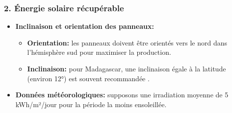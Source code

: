 \subsubsection*{2. Énergie solaire récupérable}
\begin{itemize}
	\item \textbf{Inclinaison et orientation des panneaux:}
	\begin{itemize}
		\item \textbf{Orientation:} les panneaux doivent être orientés vers le nord dans l'hémisphère sud pour maximiser la production.
		\item \textbf{Inclinaison:} pour Madagascar, une inclinaison égale à la latitude (environ 12°) est souvent recommandée \cite{pdf1}.
	\end{itemize}
	\item \textbf{Données météorologiques:} 
	supposons une irradiation moyenne de 5 kWh/m²/jour pour la période la moins ensoleillée.
\end{itemize}




